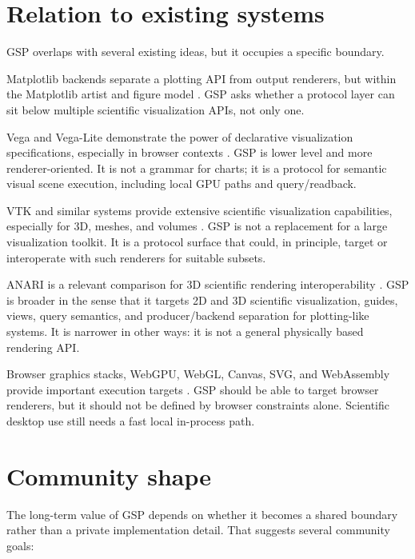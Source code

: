 \documentclass[a4paper,11pt]{article}
\newcommand{\gsp}{GSP\xspace}
\newcommand{\matplotlib}{Matplotlib\xspace}
\begin{document}
\section{Relation to existing systems}

\gsp overlaps with several existing ideas, but it occupies a specific boundary.

\matplotlib backends separate a plotting API from output renderers, but within the \matplotlib
artist and figure model \cite{Hunter:2007}. \gsp asks whether a protocol layer can sit below
multiple scientific visualization APIs, not only one.

Vega and Vega-Lite demonstrate the power of declarative visualization specifications, especially in
browser contexts \cite{Satyanarayan:2017}. \gsp is lower level and more renderer-oriented. It is
not a grammar for charts; it is a protocol for semantic visual scene execution, including local GPU
paths and query/readback.

VTK and similar systems provide extensive scientific visualization capabilities, especially for 3D,
meshes, and volumes \cite{Schroeder:2006}. \gsp is not a replacement for a large visualization
toolkit. It is a protocol surface that could, in principle, target or interoperate with such
renderers for suitable subsets.

ANARI is a relevant comparison for 3D scientific rendering interoperability \cite{Khronos:ANARI}.
\gsp is broader in the sense that it targets 2D and 3D scientific visualization, guides, views,
query semantics, and producer/backend separation for plotting-like systems. It is narrower in other
ways: it is not a general physically based rendering API.

Browser graphics stacks, WebGPU, WebGL, Canvas, SVG, and WebAssembly provide important execution
targets \cite{W3C:WebGPU}. \gsp should be able to target browser renderers, but it should not be
defined by browser constraints alone. Scientific desktop use still needs a fast local in-process
path.

\section{Community shape}

The long-term value of \gsp depends on whether it becomes a shared boundary rather than a private
implementation detail. That suggests several community goals:
\end{document}
